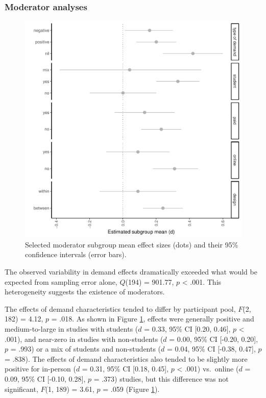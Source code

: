 \documentclass[
  man,floatsintext]{apa6}
\begin{document}
\hypertarget{moderator-analyses}{%
\subsubsection{Moderator analyses}\label{moderator-analyses}}

\begin{figure}
\centering
\includegraphics{metaware_manuscript_files/figure-latex/modforest-1.pdf}
\caption{\label{fig:modforest}Selected moderator subgroup mean effect sizes (dots) and their 95\% confidence intervals (error bars).}
\end{figure}

The observed variability in demand effects dramatically exceeded what would be expected from sampling error alone, \(Q\)(194) = 901.77, \(p\) \textless{} .001. This heterogeneity suggests the existence of moderators.

The effects of demand characteristics tended to differ by participant pool, \(F\)(2, 182) = 4.12, \(p\) = .018. As shown in Figure \ref{fig:modforest}, effects were generally positive and medium-to-large in studies with students (\(d\) = 0.33, 95\% CI {[}0.20, 0.46{]}, \(p\) \textless{} .001), and near-zero in studies with non-students (\(d\) = 0.00, 95\% CI {[}-0.20, 0.20{]}, \(p\) = .993) or a mix of students and non-students (\(d\) = 0.04, 95\% CI {[}-0.38, 0.47{]}, \(p\) = .838). The effects of demand characteristics also tended to be slightly more positive for in-person (\(d\) = 0.31, 95\% CI {[}0.18, 0.45{]}, \(p\) \textless{} .001) vs.~online (\(d\) = 0.09, 95\% CI {[}-0.10, 0.28{]}, \(p\) = .373) studies, but this difference was not significant, \(F\)(1, 189) = 3.61, \(p\) = .059 (Figure \ref{fig:modforest}).
\end{document}
